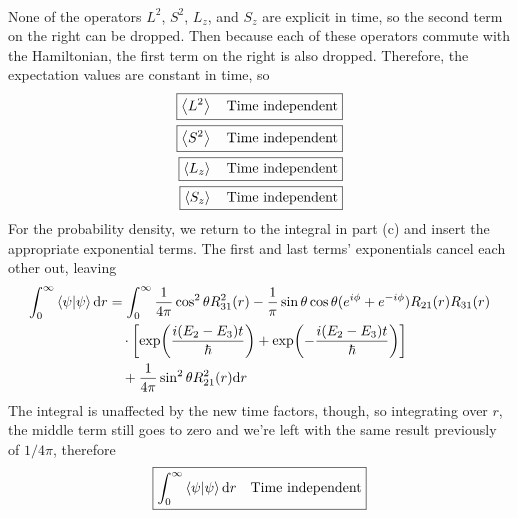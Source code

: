 \begin{enumerate}
\begin{align*}
		\end{align*}
		None of the operators $L^2$, $S^2$, $L_z$, and $S_z$ are explicit in
		time, so the second term on the right can be dropped. Then because
		each of these operators commute with the Hamiltonian, the first term
		on the right is also dropped. Therefore, the expectation values are
		constant in time, so
		\begin{align}
			\boxed{\expval{L^2} \quad\text{Time independent}} \\
			\boxed{\expval{S^2} \quad\text{Time independent}} \\
			\boxed{\expval{L_z} \quad\text{Time independent}} \\
			\boxed{\expval{S_z} \quad\text{Time independent}}
		\end{align}
		For the probability density, we return to the integral in part (c) and
		insert the appropriate exponential terms. The first and last terms'
		exponentials cancel each other out, leaving
		\begin{align*}
			\begin{split}
				\int_0^\infty  \braket{\psi }{\psi } \dd r &=
					\int_0^\infty  \frac{1}{4{\pi}}\cos^2 \theta  R_{31}^2(r) -
					\frac{1}{{\pi}} \sin \theta \cos \theta  (e^{i\phi } + e^{-i\phi })
					R_{21}(r)R_{31}(r) \\
					&\quad\cdot \left[ \exp(\frac{i(E_2-E_3)t}{{\hbar}}) +
					\exp(-\frac{i(E_2-E_3)t}{{\hbar}}) \right] \\
					&\quad + \frac{1}{4{\pi}} \sin^2 \theta  R_{21}^2(r) \dd r
			\end{split}
		\end{align*}
		The integral is unaffected by the new time factors, though, so
		integrating over $r$, the middle term still goes to zero and we're
		left with the same result previously of $1/4{\pi}$, therefore
		\begin{align}
			\boxed{
			\int_0^\infty  \braket{\psi }{\psi } \dd r \quad\text{Time independent}
			}
		\end{align}
\end{enumerate}



